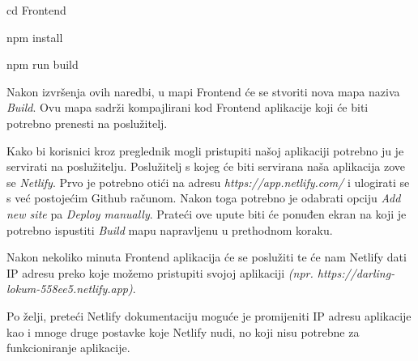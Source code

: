                 \begin{packed_item}
        			\item {cd Frontend}
        			\item {npm install}
        			\item {npm run build}
        		\end{packed_item}

              {Nakon izvršenja ovih naredbi, u mapi Frontend će se stvoriti nova mapa naziva \textit{Build}. Ovu mapa sadrži kompajlirani kod Frontend aplikacije koji će biti potrebno prenesti na poslužitelj.}\vspace{0.3cm}

              {Kako bi korisnici kroz preglednik mogli pristupiti našoj aplikaciji potrebno ju je servirati na poslužitelju. Poslužitelj s kojeg će biti servirana naša aplikacija zove se \textit{Netlify}. Prvo je potrebno otići na adresu \textit{https://app.netlify.com/} i ulogirati se s već postojećim Github računom. Nakon toga potrebno je odabrati opciju \textit{Add new site} pa \textit{Deploy manually}. Prateći ove upute biti će ponuđen ekran na koji je potrebno ispustiti \textit{Build} mapu napravljenu u prethodnom koraku.}

              {Nakon nekoliko minuta Frontend aplikacija će se poslužiti te će nam Netlify dati IP adresu preko koje možemo pristupiti svojoj aplikaciji \textit{(npr. https://darling-lokum-558ee5.netlify.app)}.}\vspace{0.3cm}
              
              {Po želji, preteći Netlify dokumentaciju moguće je promijeniti IP adresu aplikacije kao i mnoge druge postavke koje Netlify nudi, no koji nisu potrebne za funkcioniranje aplikacije.}
			\eject 